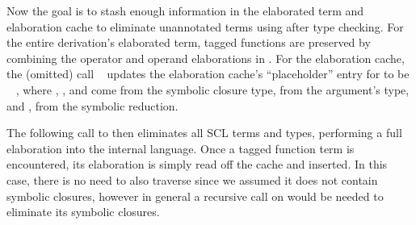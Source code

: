 Now the goal is to stash enough information in the elaborated term and elaboration cache
to eliminate unannotated terms using \ltielimClossymbol after type checking.
For the entire derivation's elaborated term,
tagged functions are preserved
by combining the operator and operand elaborations in
{}.
For the elaboration cache,
the (omitted) call
                 \ltiupdateClosureCacheSingleLHS{\ltiClosureCache{}}
                                                {\ltiClosureID{}}
                       {\ltiClosure{\ltiEmptyEnv}
                                         {\ltifunargrettype{\ltivar{}}
                                                           {{}}
                                                           {{\colorbox{pink}{\ltiS{}}}
                                                            \ }
                                                           {{\colorbox{pink}{\ltiFp{}}}}}}
updates the elaboration cache's ``placeholder'' entry
for {{\colorbox{pink}{\ltiClosureID{}}}}
to be 
                      {\ltiClosureCacheEntry
                       {{\colorbox{pink}{\ltiClosureID{}}}}
                       {\ltiClosure{\ltiEmptyEnv}
                                         {\ltifunargrettype{\ltivar{}}
                                                           {{\colorbox{pink}
                                                            {}}}
                                                           {
                                                            {\colorbox{pink}{\ltiS{}}}
                                                            \ }
                                                           {{\colorbox{pink}{\ltiFp{}}}}}}},
where {{\colorbox{pink}{\ltiClosureID{}}}},
{\ltiEmptyEnv}, and {\ltivar{}} come from the symbolic closure type,
{{\colorbox{pink}{}}} from the argument's type, 
and {\colorbox{pink}{\ltiS{}}},
{{\colorbox{pink}{\ltiFp{}}}}
from the symbolic reduction.


The following call to \ltielimClossymbol then eliminates all SCL terms
and types, performing a full elaboration into the internal language.
Once a tagged function term is encountered, its elaboration is simply read
off the cache and inserted.
In this case, there is no need
to also traverse \ltiFp{} since we assumed it does not contain symbolic closures,
however in general a recursive \ltielimClossymbol call on
\ltiFp{} would be needed to eliminate its symbolic closures.

